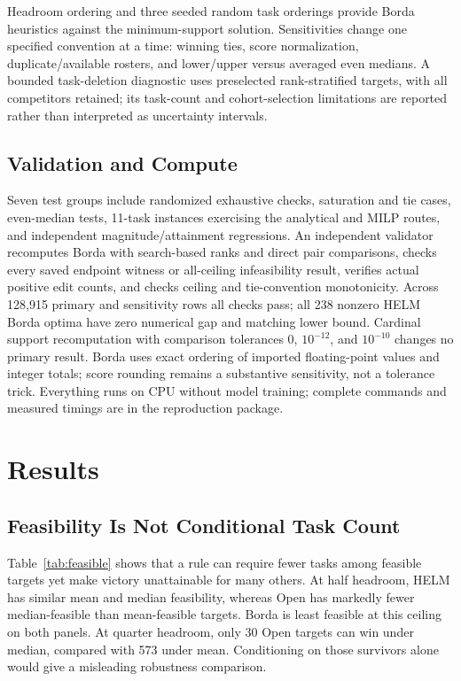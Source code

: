\documentclass{article}
\begin{document}
Headroom ordering and three seeded random task orderings provide Borda heuristics against the minimum-support solution. Sensitivities change one specified convention at a time: winning ties, score normalization, duplicate/available rosters, and lower/upper versus averaged even medians. A bounded task-deletion diagnostic uses preselected rank-stratified targets, with all competitors retained; its task-count and cohort-selection limitations are reported rather than interpreted as uncertainty intervals.

\subsection{Validation and Compute}
Seven test groups include randomized exhaustive checks, saturation and tie cases, even-median tests, 11-task instances exercising the analytical and MILP routes, and independent magnitude/attainment regressions. An independent validator recomputes Borda with search-based ranks and direct pair comparisons, checks every saved endpoint witness or all-ceiling infeasibility result, verifies actual positive edit counts, and checks ceiling and tie-convention monotonicity. Across 128,915 primary and sensitivity rows all checks pass; all 238 nonzero HELM Borda optima have zero numerical gap and matching lower bound. Cardinal support recomputation with comparison tolerances $0$, $10^{-12}$, and $10^{-10}$ changes no primary result. Borda uses exact ordering of imported floating-point values and integer totals; score rounding remains a substantive sensitivity, not a tolerance trick. Everything runs on CPU without model training; complete commands and measured timings are in the reproduction package.

\section{Results}
\subsection{Feasibility Is Not Conditional Task Count}
\begin{table}[t]
\caption{Shared-first feasibility, reported over every target. Full headroom makes all targets feasible; smaller ceilings reveal substantial rule dependence.}
\label{tab:feasible}
\centering\small

\end{table}
Table~\ref{tab:feasible} shows that a rule can require fewer tasks among feasible targets yet make victory unattainable for many others. At half headroom, HELM has similar mean and median feasibility, whereas Open has markedly fewer median-feasible than mean-feasible targets. Borda is least feasible at this ceiling on both panels. At quarter headroom, only 30 Open targets can win under median, compared with 573 under mean. Conditioning on those survivors alone would give a misleading robustness comparison.
\end{document}
